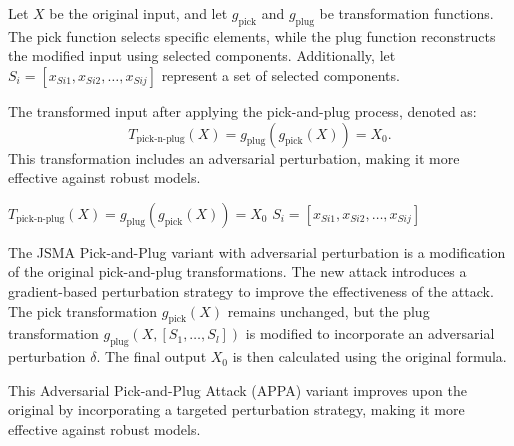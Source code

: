 Let \( X \) be the original input, and let \( g_{\text{pick}} \) and \( g_{\text{plug}} \) be transformation functions. The pick function selects specific elements, while the plug function reconstructs the modified input using selected components. Additionally, let \( S_i = [x_{Si1}, x_{Si2}, \ldots, x_{Sij}] \) represent a set of selected components.

The transformed input after applying the pick-and-plug process, denoted as:
\[
T_{\text{pick-n-plug}}(X) = g_{\text{plug}}(g_{\text{pick}}(X)) = X_0.
\]
This transformation includes an adversarial perturbation, making it more effective against robust models.


$T_{\text{pick-n-plug}}(X) = g_{\text{plug}}(g_{\text{pick}}(X)) = X_0$
$S_i = [x_{Si1}, x_{Si2}, \ldots, x_{Sij}]$

The JSMA Pick-and-Plug variant with adversarial perturbation is a modification of the original pick-and-plug transformations. The new attack introduces a gradient-based perturbation strategy to improve the effectiveness of the attack. The pick transformation $g_{\text{pick}}(X)$ remains unchanged, but the plug transformation $g_{\text{plug}}(X, [S_1, \ldots, S_l])$ is modified to incorporate an adversarial perturbation $\delta$. The final output $X_0$ is then calculated using the original formula. 

This Adversarial Pick-and-Plug Attack (APPA) variant improves upon the original by incorporating a targeted perturbation strategy, making it more effective against robust models.